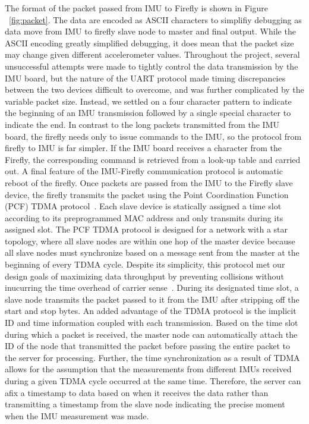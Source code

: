\documentclass[conference]{IEEEtran}
\begin{document}
  The format of the packet passed from IMU to Firefly is shown in
Figure ~\ref{fig:packet}. The data are encoded as ASCII characters to simplifiy debugging
as data move from IMU to firefly slave node to master and final output. While the ASCII
encoding greatly simplified debugging, it does mean that the packet size may change given
different accelerometer values.  Throughout the project, several unsuccessful attempts
were made to tightly control the data transmission by the IMU board, but the nature of the
UART protocol made timing discrepancies between the two devices difficult to overcome, and
was further complicated by the variable packet size. Instead, we settled on a four
character pattern to indicate the beginning of an IMU transmission followed by a single
special character to indicate the end. In contrast to the long packets transmitted from
the IMU board, the firefly needs only to issue commands to the IMU, so the protocol from
firefly to IMU is far simpler. If the IMU board receives a character from the Firefly, the
corresponding command is retrieved from a look-up table and carried out. A final feature
of the IMU-Firefly communication protocol is automatic reboot of the firefly. 
  Once packets are passed from the IMU to the Firefly slave device, the firefly transmits
the packet using the Point Coordination Function (PCF) TDMA protocol~\cite{pcf}. Each
slave device is statically assigned a time slot according to its preprogrammed MAC address
and only transmits during its assigned slot. The PCF TDMA protocol is designed for a
network with a star topology, where all slave nodes are within one hop of the master
device because all slave nodes must synchronize based on a message sent from the master at
the beginning of every TDMA cycle.  Despite its simplicity, this protocol met our design
goals of maximizing data throughput by preventing collisions without inucurring the time
overhead of carrier sense~\cite{CSMA}.  During its designated time slot, a slave node
transmits the packet passed to it from the IMU after stripping off the start and stop
bytes. An added advantage of the TDMA protocol is the implicit ID and time information
coupled with each transmission. Based on the time slot during which a packet is received,
the master node can automatically attach the ID of the node that transmitted the packet
before passing the entire packet to the server for processing. Further, the time
synchronization as a result of TDMA allows for the assumption that the measurements from
different IMUs received during a given TDMA cycle occurred at the same time. Therefore,
the server can afix a timestamp to data based on when it receives the data rather than
transmitting a timestamp from the slave node indicating the precise moment when the IMU
measurement was made. 
\end{document}

